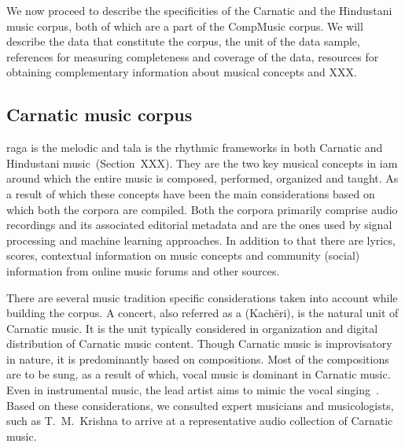 We now proceed to describe the specificities of the Carnatic and the Hindustani music corpus, both of which are a part of the CompMusic corpus. We will describe the data that constitute the corpus, the unit of the data sample, references for measuring completeness and coverage of the data, resources for obtaining complementary information about musical concepts and XXX. 


\subsection{Carnatic music corpus}
\label{sec:corpus_carnatic_music_corpus}

\Gls{raga} is the melodic and \gls{tala} is the rhythmic frameworks in both Carnatic and Hindustani music~(Section~XXX). They are the two key musical concepts in \gls{iam} around which the entire music is composed, performed, organized and taught. As a result of which these concepts have been the main considerations based on which both the corpora are compiled. Both the corpora primarily comprise audio recordings and its associated editorial metadata and are the ones used by signal processing and machine learning approaches. In addition to that there are lyrics, scores, contextual information on music concepts and community (social) information from online music forums and other sources.

There are several music tradition specific considerations taken into account while building the corpus. A concert, also referred as a (Kach\={e}ri), is the natural unit of Carnatic music. It is the unit typically considered in organization and digital distribution of Carnatic music content. Though Carnatic music is improvisatory in nature, it is predominantly based on compositions. Most of the compositions are to be sung, as a result of which, vocal music is dominant in Carnatic music. Even in instrumental music, the lead artist aims to mimic the vocal singing~\citep{Viswanathan2004}. Based on these considerations, we consulted expert musicians and musicologists, such as T.~M.~Krishna to arrive at a representative audio collection of Carnatic music.

